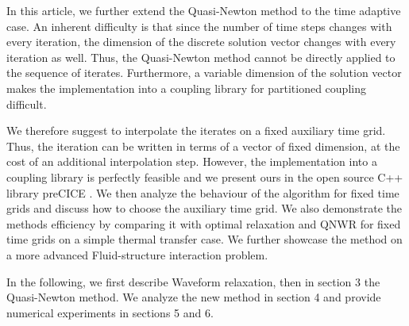 In this article, we further extend the Quasi-Newton method to the time adaptive case. An inherent difficulty is that since the number of time steps changes with every iteration, the dimension of the discrete solution vector changes with every iteration as well. Thus, the Quasi-Newton method cannot be directly applied to the sequence of iterates. Furthermore, a variable dimension of the solution vector makes the implementation into a coupling library for partitioned coupling difficult. 

We therefore suggest to interpolate the iterates on a fixed auxiliary time grid. Thus, the iteration can be written in terms of a vector of fixed dimension, at the cost of an additional interpolation step. However, the implementation into a coupling library is perfectly feasible and we present ours in the open source C++ library preCICE \cite{ChDa22}. We then analyze the behaviour of the algorithm for fixed time grids and discuss how to choose the auxiliary time grid. We also demonstrate the methods efficiency by comparing it with optimal relaxation \cite{BiMeMo23} and QNWR for fixed time grids \cite{RuUe21} on a simple thermal transfer case.  We further showcase the method on a more advanced Fluid-structure interaction problem. 

In the following, we first describe Waveform relaxation, then in section 3 the Quasi-Newton method. We analyze the new method in section 4 and provide numerical experiments in sections 5 and 6. 

